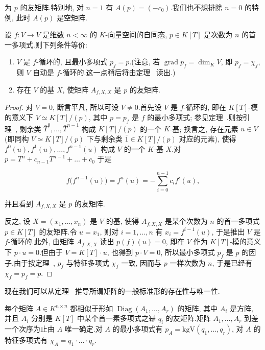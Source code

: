 为 $p$ 的友矩阵.特别地, 对 $n = 1$ 有 $A(p) = (-c_0)$.我们也不想排除 $n = 0$ 的特例, 此时 $A(p)$ 是空矩阵.

\begin{lemma}\label{lem:6.5.10}
设 $f \colon V \longrightarrow V$ 是维数 $n < \infty$ 的 $K$-向量空间的自同态, $p \in K[T]$ 是次数为 $n$ 的首一多项式.则下列条件等价:
\begin{enumerate}
\item[(i)] $V$ 是 $f$-循环的, 且最小多项式 $p_f = p$.(注意, 若 $\operatorname{grad} p_f = \dim_K V$, 即 $p_f = \chi_f$, 则 $V$ 自动是 $f$-循环的.这一点稍后将由定理~ 读出.)
\item[(ii)] 存在 $V$ 的基 $X$, 使矩阵 $A_{f, X, X}$ 是 $p$ 的友矩阵.
\end{enumerate}
\end{lemma}

\begin{proof}
对 $V = 0$, 断言平凡, 所以可设 $V \neq 0$.首先设 $V$ 是 $f$-循环的, 即在 $K[T]$-模的意义下 $V \simeq K[T]/(p)$, 其中 $p = p_f$ 是 $f$ 的最小多项式; 参见定理~.则按引理~, 剩余类 $\bar{T}^0, \ldots, \bar{T}^{n - 1}$ 构成 $K[T]/(p)$ 的一个 $K$-基; 换言之, 存在元素 $u \in V$(即同构 $V \simeq K[T]/(p)$ 下与剩余类 $\bar{1} \in K[T]/(p)$ 对应的元素), 使得 $f^0(u), f^1(u), \ldots, f^{n - 1}(u)$ 构成 $V$ 的一个 $K$-基 $X$.对 $p = T^n + c_{n - 1} T^{n - 1} + \ldots + c_0$ 于是

\[
f\big(f^{n - 1}(u)\big) = f^n(u) = -\sum_{i = 0}^{n - 1} c_i f^i(u),\]

并且看到 $A_{f, X, X}$ 是 $p$ 的友矩阵.

反之, 设 $X = (x_1, \ldots, x_n)$ 是 $V$ 的基, 使得 $A_{f, X, X}$ 是某个次数为 $n$ 的首一多项式 $p \in K[T]$ 的友矩阵.令 $u = x_1$, 则对 $i = 1, \ldots, n$ 有 $x_i = f^{i - 1}(u)$, 于是推出 $V$ 是 $f$-循环的.此外, 由矩阵 $A_{f, X, X}$ 读出 $p(f)(u) = 0$, 即在 $V$ 作为 $K[T]$-模的意义下 $p \cdot u = 0$.但由于 $V = K[T] \cdot u$, 也得到 $p \cdot V = 0$, 所以最小多项式 $p_f$ 是 $p$ 的因子.由于按定理~, $p_f$ 与特征多项式 $\chi_f$ 一致, 因而与 $p$ 一样次数为 $n$, 于是已经有 $\chi_f = p_f = p$.
\end{proof}

现在我们可以从定理~ 推导所谓矩阵的一般标准形的存在性与唯一性.

\begin{bigtheorem}[一般标准形]\label{bigthm:6.5.11}
每个矩阵 $A \in K^{n \times n}$ 都相似于形如 $\operatorname{Diag}(A_1, \ldots, A_r)$ 的矩阵, 其中 $A_i$ 是方阵, 并且 $A_i$ 分别是 $K[T]$ 中某个首一素多项式之幂 $q_i$ 的友矩阵.矩阵 $A_1, \ldots, A_r$ 到差一个次序为止由 $A$ 唯一确定.对 $A$ 的最小多项式有 $p_A = \mathrm{kgV}(q_1, \ldots, q_r)$, 对 $A$ 的特征多项式有 $\chi_A = q_1 \cdot \ldots \cdot q_r$.
\end{bigtheorem}

